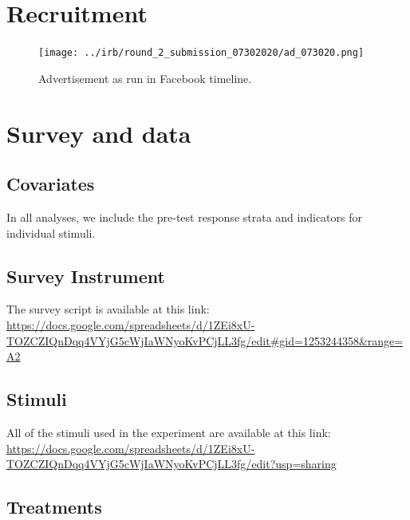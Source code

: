 \documentclass[letterpaper, 12pt, parskip=full,]{scrartcl}
\begin{document}
\clearpage



\clearpage
\appendix

\section{Recruitment}\label{appendix:recruitment}

\begin{figure}[htb]
\centering
\caption{Advertisement as run in Facebook timeline.}
\label{fig:ad}
\texttt{[image: ../irb/round\_2\_submission\_07302020/ad\_073020.png]}
\end{figure}

\section{Survey and data}\label{appendix:data}
\subsection{Covariates}\label{appendix:covariates}



In all analyses, we include the pre-test response strata and indicators for individual stimuli.

\subsection{Survey Instrument}\label{appendix:survey}
The survey script is available at this link:\\
\url{https://docs.google.com/spreadsheets/d/1ZEi8xU-TOZCZIQnDqq4VYjG5cWjIaWNyoKvPCjLL3fg/edit#gid=1253244358&range=A2}


\subsection{Stimuli}\label{appendis:stimuli}

All of the stimuli used in the experiment are available at this link:\\
\url{https://docs.google.com/spreadsheets/d/1ZEi8xU-TOZCZIQnDqq4VYjG5cWjIaWNyoKvPCjLL3fg/edit?usp=sharing}


\subsection{Treatments}
\end{document}
